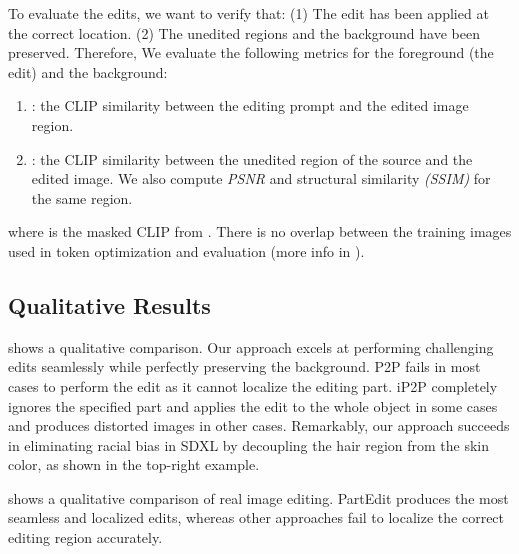 To evaluate the edits, we want to verify that: (1) The edit has been applied at the correct location. (2) The unedited regions and the background have been preserved.
Therefore, We evaluate the following metrics for the foreground (the edit) and the background:
\begin{enumerate}
\item {}: the CLIP similarity between the editing prompt and the edited image region.
\item {}:  the CLIP similarity between the unedited region of the source and the edited image. We also compute \emph{PSNR} and structural similarity \emph{(SSIM)} for the same region.
\end{enumerate}

where \aclip{} is the masked CLIP from \citep{sun2023alphaclip}. There is no overlap between the training images used in token optimization and evaluation (more info in ).



\subsection{Qualitative Results}

 shows a qualitative comparison.
Our approach excels at performing challenging edits seamlessly while perfectly preserving the background.
P2P fails in most cases to perform the edit as it cannot localize the editing part.
iP2P completely ignores the specified part and applies the edit to the whole object in some cases and produces distorted images in other cases.
Remarkably, our approach succeeds in eliminating racial bias in SDXL by decoupling the hair region from the skin color, as shown in the top-right example.

 shows a qualitative comparison of real image editing.
PartEdit produces the most seamless and localized edits, whereas other approaches fail to localize the correct editing region accurately.

